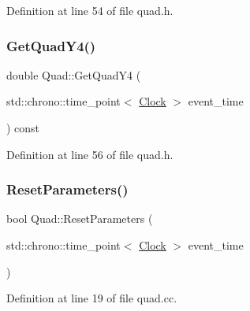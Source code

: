 Definition at line 54 of file quad.\+h.

\mbox{\label{class_quad_aff3097e4988549376102daf18b582a0b}} 
\subsubsection{\texorpdfstring{Get\+Quad\+Y4()}{GetQuadY4()}}
{\footnotesize\ttfamily double Quad\+::\+Get\+Quad\+Y4 (\begin{DoxyParamCaption}\item[{std\+::chrono\+::time\+\_\+point$<$ \mbox{\hyperlink{universe_8h_a0ef8d951d1ca5ab3cfaf7ab4c7a6fd80}{Clock}} $>$}]{event\+\_\+time }\end{DoxyParamCaption}) const\hspace{0.3cm}{\ttfamily [inline]}}



Definition at line 56 of file quad.\+h.

\mbox{\label{class_quad_af7c18022d7db1ad20bb7a1e1bd1ffb90}} 
\subsubsection{\texorpdfstring{Reset\+Parameters()}{ResetParameters()}}
{\footnotesize\ttfamily bool Quad\+::\+Reset\+Parameters (\begin{DoxyParamCaption}\item[{std\+::chrono\+::time\+\_\+point$<$ \mbox{\hyperlink{universe_8h_a0ef8d951d1ca5ab3cfaf7ab4c7a6fd80}{Clock}} $>$}]{event\+\_\+time }\end{DoxyParamCaption})}



Definition at line 19 of file quad.\+cc.

